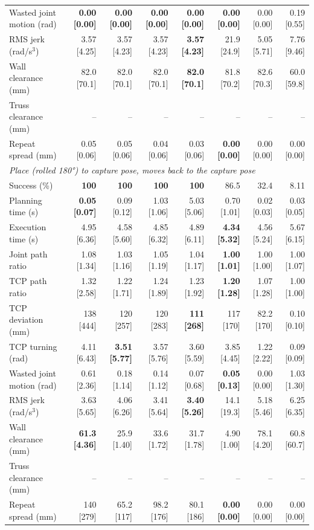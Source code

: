 \begin{table}[t]
\begin{tabular}{lrrrrrrr}
Wasted joint motion (rad) & \textbf{0.00 [0.00]} & \textbf{0.00 [0.00]} & \textbf{0.00 [0.00]} & \textbf{0.00 [0.00]} & \textbf{0.00 [0.00]} & 0.00 [0.00] & 0.19 [0.55] \\
RMS jerk (rad/s$^3$) & 3.57 [4.25] & 3.57 [4.23] & 3.57 [4.23] & \textbf{3.57 [4.23]} & 21.9 [24.9] & 5.05 [5.71] & 7.76 [9.46] \\
Wall clearance (mm) & 82.0 [70.1] & 82.0 [70.1] & 82.0 [70.1] & \textbf{82.0 [70.1]} & 81.8 [70.2] & 82.6 [70.3] & 60.0 [59.8] \\
Truss clearance (mm) & -- & -- & -- & -- & -- & -- & -- \\
Repeat spread (mm) & 0.05 [0.06] & 0.05 [0.06] & 0.04 [0.06] & 0.03 [0.06] & \textbf{0.00 [0.00]} & 0.00 [0.00] & 0.00 [0.00] \\
\midrule
\multicolumn{8}{l}{\emph{Place (rolled 180°) to capture pose, moves back to the capture pose}} \\
Success (\%) & \textbf{100} & \textbf{100} & \textbf{100} & \textbf{100} & 86.5 & 32.4 & 8.11 \\
Planning time (s) & \textbf{0.05 [0.07]} & 0.09 [0.12] & 1.03 [1.06] & 5.03 [5.06] & 0.70 [1.01] & 0.02 [0.03] & 0.03 [0.05] \\
Execution time (s) & 4.95 [6.36] & 4.58 [5.60] & 4.85 [6.32] & 4.89 [6.11] & \textbf{4.34 [5.32]} & 4.56 [5.24] & 5.67 [6.15] \\
Joint path ratio & 1.08 [1.34] & 1.03 [1.16] & 1.05 [1.19] & 1.04 [1.17] & \textbf{1.00 [1.01]} & 1.00 [1.00] & 1.00 [1.07] \\
TCP path ratio & 1.32 [2.58] & 1.22 [1.71] & 1.24 [1.89] & 1.23 [1.92] & \textbf{1.20 [1.28]} & 1.07 [1.28] & 1.00 [1.00] \\
TCP deviation (mm) & 138 [444] & 120 [257] & 120 [283] & \textbf{111 [268]} & 117 [170] & 82.2 [170] & 0.10 [0.10] \\
TCP turning (rad) & 4.11 [6.43] & \textbf{3.51 [5.77]} & 3.57 [5.76] & 3.60 [5.59] & 3.85 [4.45] & 1.22 [2.22] & 0.09 [0.09] \\
Wasted joint motion (rad) & 0.61 [2.36] & 0.18 [1.14] & 0.14 [1.12] & 0.07 [0.68] & \textbf{0.05 [0.13]} & 0.00 [0.00] & 1.03 [1.30] \\
RMS jerk (rad/s$^3$) & 3.63 [5.65] & 4.06 [6.26] & 3.41 [5.64] & \textbf{3.40 [5.26]} & 14.1 [19.3] & 5.18 [5.46] & 6.25 [6.35] \\
Wall clearance (mm) & \textbf{61.3 [4.36]} & 25.9 [1.40] & 33.6 [1.72] & 31.7 [1.78] & 4.90 [1.00] & 78.1 [4.20] & 60.8 [60.7] \\
Truss clearance (mm) & -- & -- & -- & -- & -- & -- & -- \\
Repeat spread (mm) & 140 [279] & 65.2 [117] & 98.2 [176] & 80.1 [186] & \textbf{0.00 [0.00]} & 0.00 [0.00] & 0.00 [0.00] \\
\bottomrule
\end{tabular}
\end{table}
